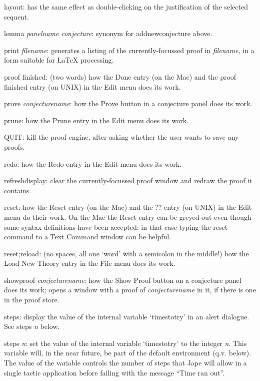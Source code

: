layout: has the same effect as double-clicking on the justification of the selected sequent.

lemma \textit{panelname} \textit{conjecture}: synonym for addnewconjecture above.


print \textit{filename}: generates a listing of the currently-focussed proof in \textit{filename}, in a form suitable for LaTeX processing.

proof finished: (two words) how the Done entry (on the Mac) and the proof finished entry (on UNIX) in the Edit menu does its work.


prove \textit{conjecturename}: how the Prove button in a conjecture panel does its work.

prune: how the Prune entry in the Edit menu does its work.

QUIT: kill the proof engine, after asking whether the user wants to save any proofs.

redo: how the Redo entry in the Edit menu does its work.

refreshdisplay: clear the currently-focussed proof window and redraw the proof it contains.


reset: how the Reset entry (on the Mac) and the ?? entry (on UNIX) in the Edit menu do their work. On the Mac the Reset entry can be greyed-out even though some syntax definitions have been accepted: in that case typing the reset command to a Text Command window can be helpful.


reset;reload: (no spaces, all one `word' with a semicolon in the middle!) how the Load New Theory entry in the File menu does its work.

showproof \textit{conjecturename}: how the Show Proof button on a conjecture panel does its work; opens a window with a proof of \textit{conjecturename} in it, if there is one in the proof store.


steps: display the value of the internal variable `timestotry' in an alert dialogue. See steps \textit{n} below.


steps \textit{n}: set the value of the internal variable `timestotry' to the integer \textit{n}. This variable will, in the near future, be part of the default environment (q.v. below). The value of the variable controls the number of steps that Jape will allow in a single tactic application before failing with the message ``Time ran out''.


